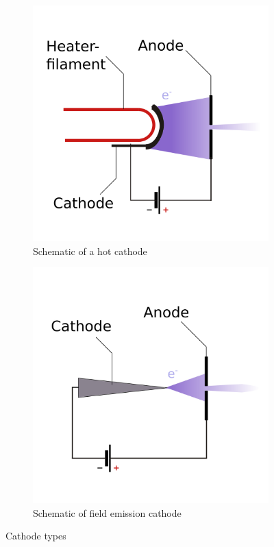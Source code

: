 \begin{figure}
	\centering
	\begin{subfigure}{0.4\textwidth}
		\centering
		\includegraphics[width=\textwidth]{Chapters/CRT-Basics/HotCathode}
		\caption{Schematic of a hot cathode}
		\label{fig:hotcathode}
	\end{subfigure}%
	\hspace{0.1\textwidth}
	\begin{subfigure}{0.4\textwidth}
		\centering
		\includegraphics[width=\textwidth]{Chapters/CRT-Basics/ColdCathode}
		
		\caption{Schematic of field emission cathode}
		\label{fig:coldcathode}
	\end{subfigure}
	\caption{Cathode types}
	\label{fig:cathodes}
\end{figure}


